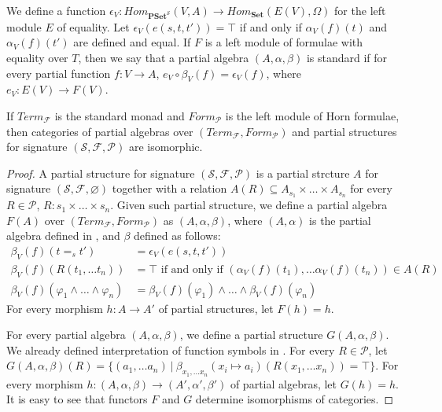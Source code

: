 \documentclass[reqno]{amsart}
\theoremstyle{definition}
\theoremstyle{remark}
\newcommand{\cat}[1]{\mathbf{#1}}
\newcommand{\Set}{\cat{Set}}
\newcommand{\PSet}{\cat{PSet}}
\numberwithin{figure}{section}
\begin{document}
We define a function $\epsilon_V : Hom_{\PSet^\mathcal{S}}(V,A) \to Hom_\Set(E(V),\Omega)$ for the left module $E$ of equality.
Let $\epsilon_V(e(s,t,t')) = \top$ if and only if $\alpha_V(f)(t)$ and $\alpha_V(f)(t')$ are defined and equal.
If $F$ is a left module of formulae with equality over $T$, then we say that a partial algebra $(A,\alpha,\beta)$ is standard
    if for every partial function $f : V \to A$, $e_V \circ \beta_V(f) = \epsilon_V(f)$, where $e_V : E(V) \to F(V)$.

\begin{lem}
If $Term_\mathcal{F}$ is the standard monad and $Form_\mathcal{P}$ is the left module of Horn formulae,
    then categories of partial algebras over $(Term_\mathcal{F},Form_\mathcal{P})$ and partial structures for signature $(\mathcal{S},\mathcal{F},\mathcal{P})$ are isomorphic.
\end{lem}
\begin{proof}
A partial structure for signature $(\mathcal{S},\mathcal{F},\mathcal{P})$ is a partial strcture $A$ for signature $(\mathcal{S},\mathcal{F},\varnothing)$
    together with a relation $A(R) \subseteq A_{s_1} \times \ldots \times A_{s_n}$ for every $R \in \mathcal{P}$, $R : s_1 \times \ldots \times s_n$.
Given such partial structure, we define a partial algebra $F(A)$ over $(Term_\mathcal{F},Form_\mathcal{P})$ as $(A,\alpha,\beta)$,
    where $(A,\alpha)$ is the partial algebra defined in , and $\beta$ defined as follows:
\begin{align*}
\beta_V(f)(t =_s t') & = \epsilon_V(e(s,t,t')) \\
\beta_V(f)(R(t_1, \ldots t_n)) & = \top \text{ if and only if } (\alpha_V(f)(t_1), \ldots \alpha_V(f)(t_n)) \in A(R) \\
\beta_V(f)(\varphi_1 \land \ldots \land \varphi_n) & = \beta_V(f)(\varphi_1) \land \ldots \land \beta_V(f)(\varphi_n)
\end{align*}
For every morphism $h : A \to A'$ of partial structures, let $F(h) = h$.

For every partial algebra $(A,\alpha,\beta)$, we define a partial structure $G(A,\alpha,\beta)$.
We already defined interpretation of function symbols in .
For every $R \in \mathcal{P}$, let $G(A,\alpha,\beta)(R) = \{ (a_1, \ldots a_n)\ |\ \beta_{x_1, \ldots x_n}(x_i \mapsto a_i)(R(x_1, \ldots x_n)) = \top \}$.
For every morphism $h : (A,\alpha,\beta) \to (A',\alpha',\beta')$ of partial algebras, let $G(h) = h$.
It is easy to see that functors $F$ and $G$ determine isomorphisms of categories.
\end{proof}
\end{document}
